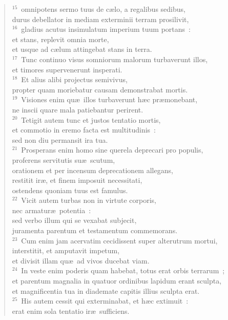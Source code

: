 \begin{flushleft}
\begin{verse}
${}^{15}$~omnipotens sermo tuus de c\ae lo, a regalibus sedibus,\\ durus debellator in mediam exterminii terram prosilivit,\\
${}^{16}$~gladius acutus insimulatum imperium tuum portans~:\\ et stans, replevit omnia morte,\\ et usque ad c\ae lum attingebat stans in terra.\\
${}^{17}$~Tunc continuo visus somniorum malorum turbaverunt illos,\\ et timores supervenerunt insperati.\\
${}^{18}$~Et alius alibi projectus semivivus,\\ propter quam moriebatur causam demonstrabat mortis.\\
${}^{19}$~Visiones enim qu\ae\ illos turbaverunt h\ae c pr\ae monebant,\\ ne inscii quare mala patiebantur perirent.\\
${}^{20}$~Tetigit autem tunc et justos tentatio mortis,\\ et commotio in eremo facta est multitudinis~:\\ sed non diu permansit ira tua.\\
${}^{21}$~Prosperans enim homo sine querela deprecari pro populis,\\ proferens servitutis su\ae\ scutum,\\ orationem et per incensum deprecationem allegans,\\ restitit ir\ae , et finem imposuit necessitati,\\ ostendens quoniam tuus est famulus.\\
${}^{22}$~Vicit autem turbas non in virtute corporis,\\ nec armatur\ae\ potentia~:\\ sed verbo illum qui se vexabat subjecit,\\ juramenta parentum et testamentum commemorans.\\
${}^{23}$~Cum enim jam acervatim cecidissent super alterutrum mortui,\\ interstitit, et amputavit impetum,\\ et divisit illam qu\ae\ ad vivos ducebat viam.\\
${}^{24}$~In veste enim poderis quam habebat, totus erat orbis terrarum~;\\ et parentum magnalia in quatuor ordinibus lapidum erant sculpta,\\ et magnificentia tua in diademate capitis illius sculpta erat.\\
${}^{25}$~His autem cessit qui exterminabat, et h\ae c extimuit~:\\ erat enim sola tentatio ir\ae\ sufficiens.\end{verse}\end{flushleft}


